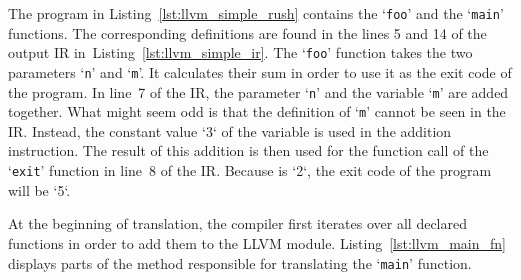 

The program in Listing~\ref{lst:llvm_simple_rush} contains the `\texttt{foo}' and the `\texttt{main}' functions.
The corresponding definitions are found in the lines 5 and 14 of the output IR in~Listing~\ref{lst:llvm_simple_ir}.
The `\texttt{foo}' function takes the two parameters `\texttt{n}' and `\texttt{m}'.
It calculates their sum in order to use it as the exit code of the program.
In line~7 of the IR, the parameter `\texttt{n}' and the variable `\texttt{m}' are added together.
What might seem odd is that the definition of `\texttt{m}' cannot be seen in the IR\@.
Instead, the constant value `3` of the variable is used in the addition instruction.
The result of this addition is then used for the function call of the `\texttt{exit}' function in line~8 of the IR\@.
Because  is `2`, the exit code of the program will be `5`.

At the beginning of translation, the compiler first iterates over all declared functions in order to add them to the LLVM module.
Listing~\ref{lst:llvm_main_fn} displays parts of the method responsible for translating the `\texttt{main}' function.


